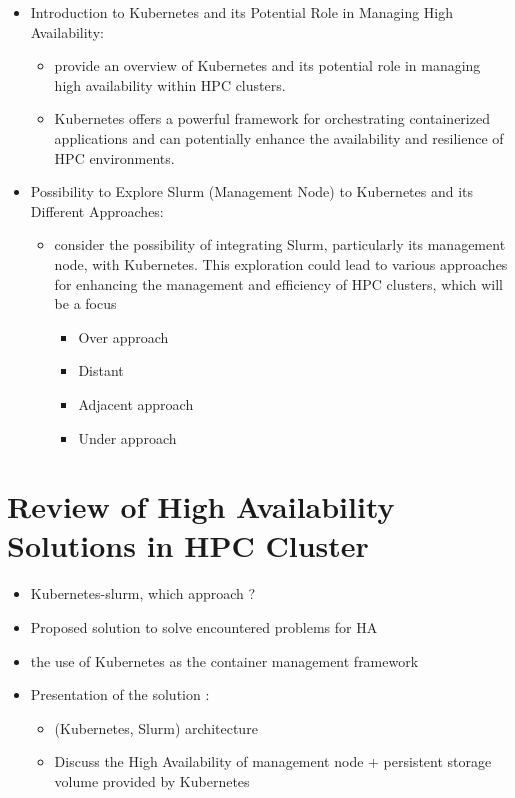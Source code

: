 \documentclass{article}
\begin{document}
\begin{itemize}
    \item Introduction to Kubernetes and its Potential Role in Managing High Availability:
    \begin{itemize}
          \item  provide an overview of Kubernetes and its potential role in managing high availability within HPC clusters. 
          \item Kubernetes offers a powerful framework for orchestrating containerized applications and can potentially enhance the availability and resilience of HPC environments.
    \end{itemize}
   \item  Possibility to Explore Slurm (Management Node) to Kubernetes and its Different Approaches:
    \begin{itemize}
    \item consider the possibility of integrating Slurm, particularly its management node, with Kubernetes. This exploration could lead to various approaches for enhancing the management and efficiency of HPC clusters, which will be a focus
        \begin{itemize}
            \item Over approach
            \item  Distant
            \item Adjacent approach 
            \item Under approach       
        \end{itemize}
    \end{itemize}

\end{itemize}

\section{Review of High Availability Solutions in HPC Cluster }
\begin{itemize}
    \item  Kubernetes-slurm, which approach ?
    \item Proposed solution to solve encountered problems for HA
    \item the use of Kubernetes as the container management framework 

    \item Presentation of the solution :
        \begin{itemize}
            \item (Kubernetes, Slurm) architecture
            \item Discuss the High Availability of management node + persistent storage volume provided by Kubernetes
        \end{itemize}
\end{itemize}
\end{document}
